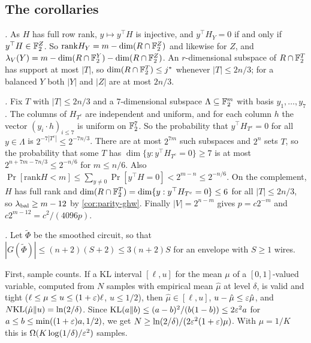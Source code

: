 \subsection{The corollaries}

\emph{.} As $H$ has full row rank, $y\mapsto y^\top H$ is
injective, and $y^\top H_Y=0$ if and only if $y^\top H\in\mathbb{F}_2^Z$. So
$\mathrm{rank}H_Y=m-\dim(R\cap\mathbb{F}_2^Z)$ and likewise for $Z$, and
$\lambda_V(Y)=m-\dim(R\cap\mathbb{F}_2^Y)-\dim(R\cap\mathbb{F}_2^Z)$. An $r$-dimensional subspace of
$R\cap\mathbb{F}_2^T$ has support at most $|T|$, so $\dim(R\cap\mathbb{F}_2^T)\le j^*$ whenever
$|T|\le2n/3$; for a balanced $Y$ both $|Y|$ and $|Z|$ are at most $2n/3$.

\emph{.} Fix $T$ with $|T|\le2n/3$ and a $7$-dimensional
subspace $\Lambda\subseteq\mathbb{F}_2^m$ with basis $y_1,\dots,y_7$. The columns of
$H_{T^c}$ are independent and uniform, and for each column $h$ the vector $(y_i\cdot
h)_{i\le7}$ is uniform on $\mathbb{F}_2^7$. So the probability that $y^\top H_{T^c}=0$ for all
$y\in\Lambda$ is $2^{-7|T^c|}\le2^{-7n/3}$. There are at most $2^{7m}$ such subspaces
and $2^n$ sets $T$, so the probability that some $T$ has
$\dim\{y:y^\top H_{T^c}=0\}\ge7$ is at most $2^{n+7m-7n/3}\le2^{-n/6}$ for $m\le n/6$.
Also $\Pr[\mathrm{rank}H<m]\le\sum_{y\ne0}\Pr[y^\top H=0]<2^{m-n}\le2^{-n/6}$. On the
complement, $H$ has full rank and $\dim(R\cap\mathbb{F}_2^T)=\dim\{y:y^\top H_{T^c}=0\}\le6$
for all $|T|\le2n/3$, so $\lambda_{\rm bal}\ge m-12$ by \cref{cor:parity-ghw}. Finally
$|V|=2^{n-m}$ gives $p=c2^{-m}$ and $c2^{m-12}=c^2/(4096p)$.

\emph{.} Let $\widetilde\Phi$ be the smoothed circuit, so
that $|G(\widetilde\Phi)|\le(n+2)(S+2)\le3(n+2)S$ for an envelope with $S\ge1$ wires.

First, sample counts. If a KL interval $[\ell,u]$ for the mean $\mu$ of a $[0,1]$-valued
variable, computed from $N$ samples with empirical mean $\hat\mu$ at level $\delta$, is
valid and tight ($\ell\le\mu\le u\le(1+\varepsilon)\ell$, $u\le1/2$), then
$\hat\mu\in[\ell,u]$, $u-\hat\mu\le\varepsilon\hat\mu$, and $N\mathrm{KL}(\hat\mu\|u)=\ln(2/\delta)$.
Since $\mathrm{KL}(a\|b)\le(a-b)^2/(b(1-b))\le2\varepsilon^2a$ for $a\le b\le\min((1+\varepsilon)a,1/2)$, we
get $N\ge\ln(2/\delta)/(2\varepsilon^2(1+\varepsilon)\mu)$. With $\mu=1/K$ this is
$\Omega(K\log(1/\delta)/\varepsilon^2)$ samples.

